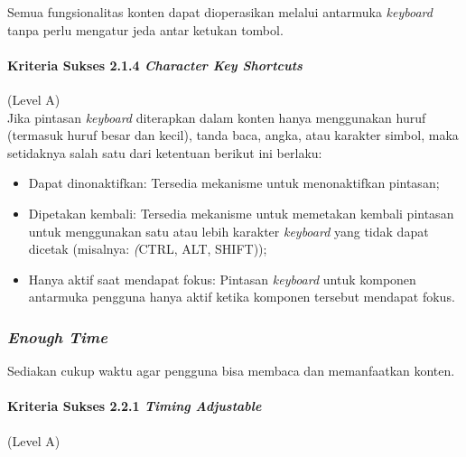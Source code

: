 Semua fungsionalitas konten dapat dioperasikan melalui antarmuka \textit{keyboard} tanpa perlu mengatur jeda antar ketukan tombol.

\paragraph{Kriteria Sukses 2.1.4 \textit{Character Key Shortcuts}}
\label{sec:kriteria_sukses_2.1.4}
(Level A)\\

Jika pintasan \textit{keyboard} diterapkan dalam konten hanya menggunakan huruf (termasuk huruf besar dan kecil), tanda baca, angka, atau karakter simbol, maka setidaknya salah satu dari ketentuan berikut ini berlaku:
\begin{itemize}
	\item Dapat dinonaktifkan: Tersedia mekanisme untuk menonaktifkan pintasan;
	\item Dipetakan kembali: Tersedia mekanisme untuk memetakan kembali pintasan untuk menggunakan satu atau lebih karakter \textit{keyboard} yang tidak dapat dicetak (misalnya: \textit(CTRL, ALT, SHIFT));
	\item Hanya aktif saat mendapat fokus: Pintasan \textit{keyboard} untuk komponen antarmuka pengguna hanya aktif ketika komponen tersebut mendapat fokus.
\end{itemize}

\subsubsection{\textit{Enough Time}}
\label{sec:enough_time}
Sediakan cukup waktu agar pengguna bisa membaca dan memanfaatkan konten.

\paragraph{Kriteria Sukses 2.2.1 \textit{Timing Adjustable}}
\label{sec:kriteria_sukses_2.2.1}
(Level A)\\

